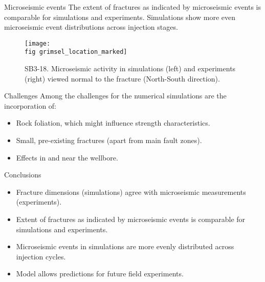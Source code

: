 \documentclass[final,t, 6pt]{beamer}
\begin{document}
\begin{frame}{}
\begin{columns}[t]
\begin{column}{.48\linewidth}
\begin{block}{Microseismic events}
	\vspace{10mm}
	The extent of fractures as indicated by microseismic events is comparable for simulations and experiments. Simulations show more even microseismic event distributions across injection stages. 

	\begin{figure}
	  \begin{center}
	    \texttt{[image: \\fig grimsel\_location\_marked]}
	    \caption{SB3-18. Microseismic activity in simulations (left) and experiments (right) viewed normal to the fracture (North-South direction).}
	  \end{center} 
	\end{figure}
    \end{block}
    
    
    
    \begin{block}{Challenges}
      Among the challenges for the numerical simulations are the incorporation of:
        \begin{itemize}
	  \item \alert{Rock foliation}, which might influence strength characteristics.\\[5pt]
	  \item \alert{Small, pre-existing fractures} (apart from main fault zones).\\[5pt]
	  \item Effects in and near the wellbore.
      \end{itemize}
    \end{block}

   
    \begin{alertblock}{Conclusions}
      \begin{itemize}
	\item \alert{Fracture dimensions} (simulations) agree with \alert{microseismic measurements} (experiments).
	\item Extent of fractures as indicated by microseismic events is comparable for simulations and experiments. 
	\item Microseismic events in simulations are \alert{more evenly distributed across injection cycles}. 
	\item Model allows predictions for \alert{future field experiments}. 
      \end{itemize}
    \end{alertblock}

    
   

\end{column}
\end{columns}
\end{frame}
\end{document}
